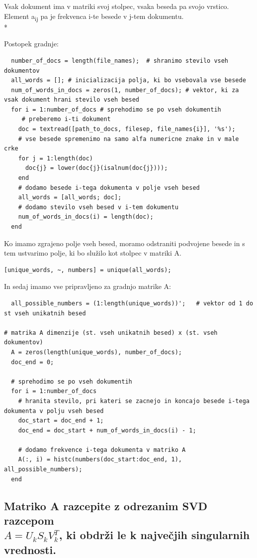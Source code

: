 \documentclass{article}
\begin{document}
 Vsak dokument  ima v matriki svoj stolpec, vsaka beseda pa svojo vrstico. Element a\textsubscript{ij} pa je frekvenca i-te besede v j-tem dokumentu.\\*

Postopek gradnje:
\begin{lstlisting}
  number_of_docs = length(file_names);  # shranimo stevilo vseh dokumentov
  all_words = []; # inicializacija polja, ki bo vsebovala vse besede
  num_of_words_in_docs = zeros(1, number_of_docs); # vektor, ki za vsak dokument hrani stevilo vseh besed
  for i = 1:number_of_docs # sprehodimo se po vseh dokumentih
     # preberemo i-ti dokument
    doc = textread([path_to_docs, filesep, file_names{i}], '%s');
    # vse besede spremenimo na samo alfa numericne znake in v male crke
    for j = 1:length(doc)
      doc{j} = lower(doc{j}(isalnum(doc{j})));
    end
    # dodamo besede i-tega dokumenta v polje vseh besed
    all_words = [all_words; doc]; 
    # dodamo stevilo vseh besed v i-tem dokumentu
    num_of_words_in_docs(i) = length(doc); 
  end

\end{lstlisting}
Ko imamo zgrajeno polje vseh besed, moramo odstraniti podvojene besede in s tem ustvarimo polje, ki bo služilo kot stolpec v matriki A.
\begin{lstlisting}
[unique_words, ~, numbers] = unique(all_words);
\end{lstlisting}

In sedaj imamo vse pripravljeno za gradnjo matrike A:

\begin{lstlisting}
  all_possible_numbers = (1:length(unique_words))';   # vektor od 1 do st vseh unikatnih besed

# matrika A dimenzije (st. vseh unikatnih besed) x (st. vseh dokumentov) 
  A = zeros(length(unique_words), number_of_docs);
  doc_end = 0;

  # sprehodimo se po vseh dokumentih
  for i = 1:number_of_docs
    # hranita stevilo, pri kateri se zacnejo in koncajo besede i-tega dokumenta v polju vseh besed 
    doc_start = doc_end + 1; 
    doc_end = doc_start + num_of_words_in_docs(i) - 1;

    # dodamo frekvence i-tega dokumenta v matriko A
    A(:, i) = histc(numbers(doc_start:doc_end, 1), all_possible_numbers);
  end
\end{lstlisting}

\subsection{Matriko A razcepite z odrezanim SVD razcepom \\
 \( A = U_{k}S_{k}V^{T}_{k} \), ki obdrži le k največjih singularnih vrednosti.}
\end{document}
